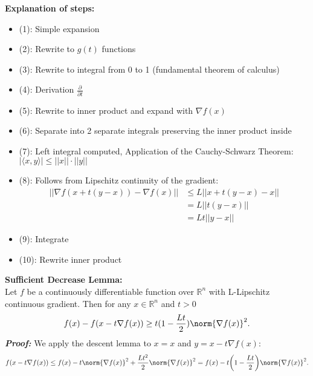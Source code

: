 \documentclass[12pt,a4paper]{article}
\begin{document}
\textbf{Explanation of steps:}
\begin{itemize}
    \item (1): Simple expansion
    \item (2): Rewrite to $g(t)$ functions
    \item (3): Rewrite to integral from 0 to 1 (fundamental theorem of calculus)
    \item (4): Derivation $\frac{\partial}{\partial t}$
    \item (5): Rewrite to inner product and expand with $\nabla f(x)$
    \item (6): Separate into 2 separate integrals preserving the inner product inside
    \item (7): Left integral computed, Application of the Cauchy-Schwarz Theorem: $|\langle x,y \rangle| \leq ||x|| \cdot ||y||$ 
    \item (8): Follows from Lipschitz continuity of the gradient:
    \begin{align*}
        ||\nabla f(x+t(y-x)) - \nabla f(x)|| &\leq L||x+t(y-x) - x||\\
        &= L||t(y-x)||\\
        &= Lt||y-x||
    \end{align*}
    \item (9): Integrate
    \item (10): Rewrite inner product
\end{itemize}

\textbf{Sufficient Decrease Lemma:}\\
Let $f$ be a continuously differentiable function over $ \mathbb{R}^n$ with  L-Lipschitz continuous gradient. Then for any $x\in \mathbb{R}^n$ and $t>0$
\begin{equation*}
	    f(x) - f(x - t\nabla f(x)) \geq t(1-\frac{Lt}{2})\norm{\nabla f(x)}^2.
\end{equation*}
\textbf{\textit{Proof:}} We apply the descent lemma to $x = x$ and $y = x - t\nabla f(x)$:
    \begin{equation*}
    f(x-t\nabla f(x)) \leq f(x) - t\norm{\nabla f(x)}^2 + \frac{Lt^2}{2}\norm{\nabla f(x)}^2 = f(x) - t\biggl(1 - \frac{Lt}{2}\biggr)\norm{\nabla f(x)}^2.
	\end{equation*}
	
\end{document}
